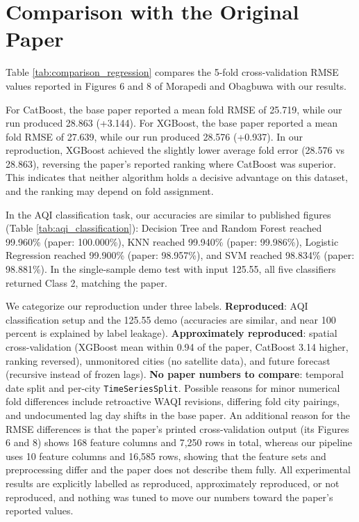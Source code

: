 \section{Comparison with the Original Paper}
Table \ref{tab:comparison_regression} compares the 5-fold cross-validation RMSE values reported in Figures 6 and 8 of Morapedi and Obagbuwa \cite{morapedi2023air} with our results.

\begin{table}[htbp]
\centering
\small
\renewcommand{\arraystretch}{0.88}
\caption{Side-by-Side Comparison of Regression Cross-Validation RMSE (Fold-by-fold comparison is indicative because fold city assignments differ; the primary comparison is the mean across folds)}
\label{tab:comparison_regression}

\end{table}

For CatBoost, the base paper reported a mean fold RMSE of 25.719, while our run produced 28.863 (+3.144). For XGBoost, the base paper reported a mean fold RMSE of 27.639, while our run produced 28.576 (+0.937). In our reproduction, XGBoost achieved the slightly lower average fold error (28.576 vs 28.863), reversing the paper's reported ranking where CatBoost was superior. This indicates that neither algorithm holds a decisive advantage on this dataset, and the ranking may depend on fold assignment.

In the AQI classification task, our accuracies are similar to published figures (Table \ref{tab:aqi_classification}): Decision Tree and Random Forest reached 99.960\% (paper: 100.000\%), KNN reached 99.940\% (paper: 99.986\%), Logistic Regression reached 99.900\% (paper: 98.957\%), and SVM reached 98.834\% (paper: 98.881\%). In the single-sample demo test with input 125.55, all five classifiers returned Class 2, matching the paper.

We categorize our reproduction under three labels. \textbf{Reproduced}: AQI classification setup and the 125.55 demo (accuracies are similar, and near 100 percent is explained by label leakage). \textbf{Approximately reproduced}: spatial cross-validation (XGBoost mean within 0.94 of the paper, CatBoost 3.14 higher, ranking reversed), unmonitored cities (no satellite data), and future forecast (recursive instead of frozen lags). \textbf{No paper numbers to compare}: temporal date split and per-city \texttt{TimeSeriesSplit}. Possible reasons for minor numerical fold differences include retroactive WAQI revisions, differing fold city pairings, and undocumented lag day shifts in the base paper. An additional reason for the RMSE differences is that the paper's printed cross-validation output (its Figures 6 and 8) shows 168 feature columns and 7,250 rows in total, whereas our pipeline uses 10 feature columns and 16,585 rows, showing that the feature sets and preprocessing differ and the paper does not describe them fully. All experimental results are explicitly labelled as reproduced, approximately reproduced, or not reproduced, and nothing was tuned to move our numbers toward the paper's reported values.
